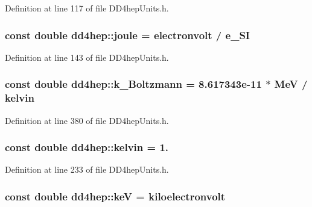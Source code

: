 Definition at line 117 of file DD4hepUnits.h.\hypertarget{namespacedd4hep_a8cdc11c61e5f953baede59569544a324}{
\subsubsection[{joule}]{\setlength{\rightskip}{0pt plus 5cm}const double {\bf dd4hep::joule} = {\bf electronvolt} / {\bf e\_\-SI}}}
\label{namespacedd4hep_a8cdc11c61e5f953baede59569544a324}


Definition at line 143 of file DD4hepUnits.h.\hypertarget{namespacedd4hep_afc99056ae68c67788d6d7555a866e175}{
\subsubsection[{k\_\-Boltzmann}]{\setlength{\rightskip}{0pt plus 5cm}const double {\bf dd4hep::k\_\-Boltzmann} = 8.617343e-\/11 $\ast$ MeV / kelvin}}
\label{namespacedd4hep_afc99056ae68c67788d6d7555a866e175}


Definition at line 380 of file DD4hepUnits.h.\hypertarget{namespacedd4hep_ae4984489719e11b38858934cc4c1e54e}{
\subsubsection[{kelvin}]{\setlength{\rightskip}{0pt plus 5cm}const double {\bf dd4hep::kelvin} = 1.}}
\label{namespacedd4hep_ae4984489719e11b38858934cc4c1e54e}


Definition at line 233 of file DD4hepUnits.h.\hypertarget{namespacedd4hep_a2b928c9b9d50fa8a9d3f9840f3a5f258}{
\subsubsection[{keV}]{\setlength{\rightskip}{0pt plus 5cm}const double {\bf dd4hep::keV} = {\bf kiloelectronvolt}}}
\label{namespacedd4hep_a2b928c9b9d50fa8a9d3f9840f3a5f258}


